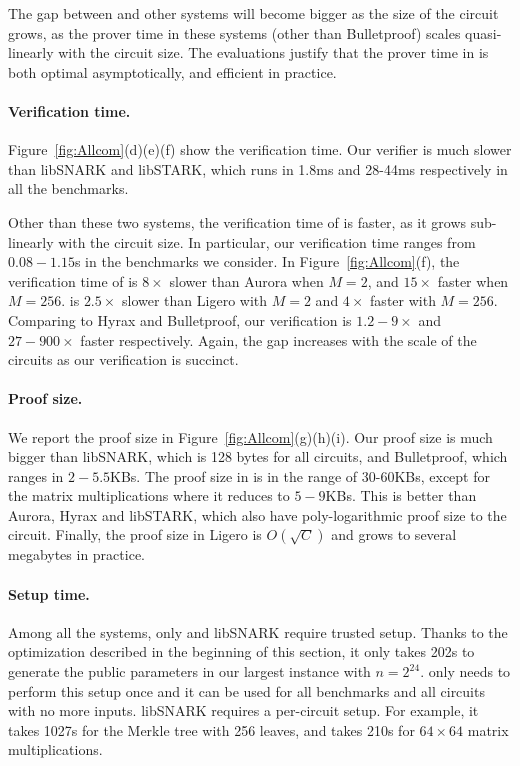 The gap between \name and other systems will become bigger as the size of the circuit grows, as the prover time in these systems (other than Bulletproof) scales quasi-linearly with the circuit size. The evaluations justify that the prover time in \name is both optimal asymptotically, and efficient in practice.

\paragraph{Verification time.} Figure~\ref{fig:Allcom}(d)(e)(f) show the verification time. Our verifier is much slower than \textsf{libSNARK} and \textsf{libSTARK}, which runs in 1.8ms and 28-44ms respectively in all the benchmarks. 

Other than these two systems, the verification time of \name is faster, as it grows sub-linearly with the circuit size. In particular, our verification time ranges from $0.08-1.15$s in the benchmarks we consider. In Figure~\ref{fig:Allcom}(f), the verification time of \name is $8\times$ slower than \textsf{Aurora} when $M=2$, and $15\times$ faster when $M=256$. \name is $2.5\times$ slower than \textsf{Ligero} with $M=2$ and $4\times$ faster with $M=256$. Comparing to \textsf{Hyrax} and \textsf{Bulletproof}, our verification is $1.2-9\times$ and $27-900\times$ faster respectively. Again, the gap increases with the scale of the circuits as our verification is succinct.

\paragraph{Proof size.} We report the proof size in Figure~\ref{fig:Allcom}(g)(h)(i). Our proof size is much bigger than \textsf{libSNARK}, which is 128 bytes for all circuits, and \textsf{Bulletproof}, which ranges in $2-5.5$KBs. The proof size in \name is in the range of 30-60KBs, except for the matrix multiplications where it reduces to $5-9$KBs. This is better than \textsf{Aurora}, \textsf{Hyrax} and \textsf{libSTARK}, which also have poly-logarithmic proof size to the circuit. Finally, the proof size in \textsf{Ligero} is $O(\sqrt{C})$ and grows to several megabytes in practice.

\paragraph{Setup time.} Among all the systems, only \name and \textsf{libSNARK} require trusted setup. Thanks to the optimization described in the beginning of this section, it only takes 202s to generate the public parameters in our largest instance with $n = 2^{24}$. \name only needs to perform this setup once and it can be used for all benchmarks and all circuits with no more inputs. \textsf{libSNARK} requires a per-circuit setup. For example, it takes 1027s for the Merkle tree with 256 leaves, and takes 210s for $64\times 64$ matrix multiplications.

